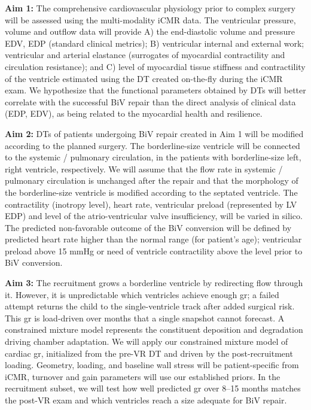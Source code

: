 
{\bf Aim 1:} The comprehensive cardiovascular physiology prior to complex surgery will be assessed using  the multi-modality  iCMR data. 
The ventricular pressure, volume and outflow data will provide A) the end-diastolic volume and pressure EDV, EDP (standard clinical metrics); B) ventricular internal and external work; ventricular and arterial elastance (surrogates of myocardial contractility and circulation resistance); and C) level of myocardial tissue stiffness and contractility of the ventricle estimated using the DT created on-the-fly during the iCMR exam. We hypothesize that the functional parameters obtained by DTs will better correlate with the successful BiV repair than the direct analysis of clinical data (EDP, EDV), as being related to the myocardial health and resilience.  


{\bf Aim 2:} DTs of patients undergoing BiV repair created in Aim 1 will be modified according to the planned surgery. The borderline-size ventricle will be connected to the systemic / pulmonary circulation, in the patients with borderline-size left, right ventricle, respectively. We will assume that the flow rate in systemic / pulmonary circulation is unchanged after the repair and that the morphology of the borderline-size ventricle is modified according to the septated ventricle. %
The contractility (inotropy level), heart rate, ventricular preload (represented by LV EDP) and level of the atrio-ventricular valve insufficiency, will be varied in silico. The predicted non-favorable outcome of the BiV conversion will be defined by predicted heart rate higher than the normal range (for patient’s age); ventricular preload above 15 mmHg or need of ventricle contractility above the level prior to BiV conversion. 

{\bf Aim 3:} The recruitment grows a borderline ventricle by redirecting flow through it. However, it is unpredictable which ventricles achieve enough \gls*{gr}; a failed attempt returns the child to the single-ventricle track after added surgical risk. This \gls*{gr} is load-driven over months that a single snapshot cannot forecast. A constrained mixture model represents the constituent deposition and degradation driving chamber adaptation. We will apply our constrained mixture model of cardiac \gls*{gr},\cite{gebauer23,gebauer24} initialized from the pre-VR DT and driven by the post-recruitment loading. Geometry, loading, and baseline wall stress will be patient-specific from iCMR, turnover and gain parameters will use our established priors. In the recruitment subset, we will test how well predicted \gls*{gr} over 8--15 months matches the post-VR exam and which ventricles reach a size adequate for BiV repair.


